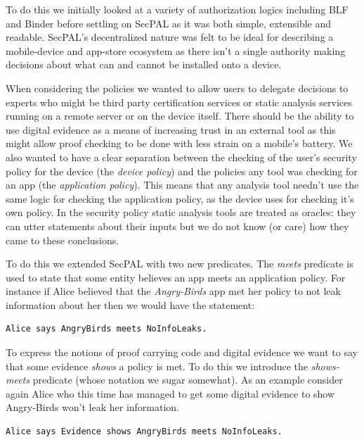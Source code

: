 \documentclass[a4paper,12pt,sfsidenotes]{tufte-book}
\begin{document}
To do this we initially looked at a variety of authorization logics including
BLF\cite{Whitehead:2004bu} and Binder\cite{DeTreville:2002ff} before settling on
SecPAL as it was both simple, extensible and readable.  SecPAL's decentralized
nature was felt to be ideal for describing a mobile-device and app-store
ecosystem as there isn't a single authority making decisions about what can and
cannot be installed onto a device.  

When considering the policies we wanted to allow users to delegate decisions to
experts who might be third party certification services or static analysis
services running on a remote server or on the device itself.  There should be
the ability to use digital evidence\cite{Stark:2009uc} as a means of increasing
trust in an external tool as this might allow proof checking to be done with
less strain on a mobile's battery.  We also wanted to have a clear separation
between the checking of the user's security policy for the device (the
\emph{device policy}) and the policies any tool was checking for an app (the
\emph{application policy}).  This means that any analysis tool needn't use the
same logic for checking the application policy, as the device uses for checking
it's own policy.  In the security policy static analysis tools are treated as
oracles: they can utter statements about their inputs but we do not know (or
care) how they came to these conclusions.

To do this we extended SecPAL with two new predicates.  The \emph{meets}
predicate is used to state that some entity believes an app meets an application
policy.  For instance if Alice believed that the \emph{Angry-Birds} app met her
policy to not leak information about her then we would have the statement:

\begin{lstlisting}[language=SecPAL]
Alice says AngryBirds meets NoInfoLeaks.
\end{lstlisting}

To express the notions of proof carrying code\cite{Necula:1996tr} and digital
evidence we want to say that some evidence \emph{shows} a policy is met.  To do
this we introduce the \emph{shows-meets} predicate (whose notation we sugar
somewhat).  As an example consider again Alice who this time has managed to get
some digital evidence to show Angry-Birds won't leak her information.

\begin{lstlisting}[language=SecPAL]
Alice says Evidence shows AngryBirds meets NoInfoLeaks.
\end{lstlisting}
\end{document}
